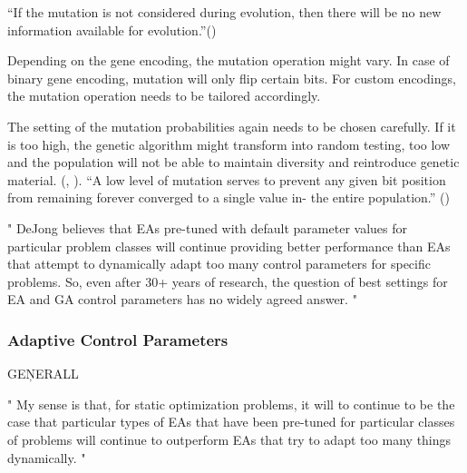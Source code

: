 \enquote{If the mutation is not considered during evolution, then there will be no new information available for evolution.}(\cite{katoch_review_2021})

Depending on the gene encoding, the mutation operation might vary. In case of binary gene encoding, mutation will only flip certain bits. For custom encodings, the mutation operation needs to be tailored accordingly.

The setting of the mutation probabilities again needs to be chosen carefully. If it is too high, the genetic algorithm might transform into random testing, too low and the population will not be able to maintain diversity and reintroduce genetic material. (\cite{klampfl_using_nodate}, \cite{grefenstette_optimization_1986}). 
\enquote{A low level of mutation serves to prevent any given bit position from remaining forever converged to a single value in- the entire population.} (\cite{grefenstette_optimization_1986})


"
DeJong believes that EAs pre-tuned with default parameter values for particular problem classes will continue providing better performance than EAs that attempt to dynamically adapt too many control parameters for specific problems. So, even after 30+ years of research, the question of best settings for EA and GA control parameters has no widely agreed answer.
"\cite{mills_determining_2015}


\subsubsection{Adaptive Control Parameters}

GEŅERALL

"
My sense is that, for static optimization problems, it will to continue to be the case that particular types of EAs that have been pre-tuned for particular classes of problems will continue to outperform EAs that try to adapt too many things dynamically.
"\cite{kacprzyk_parameter_2007}

